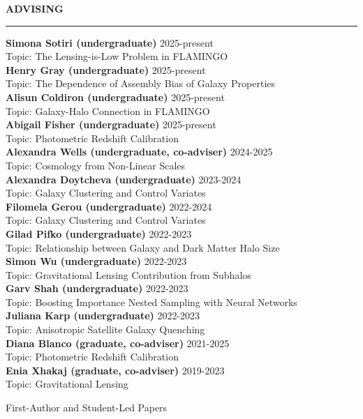 \documentclass[12pt]{article}
\renewenvironment{section}[1]
  {
  \medskip
  {\color{aublue} \MakeUppercase{\bf #1}}
  \smallskip
  \hrule
  \medskip
  \begin{adjustwidth}{0.3cm}{}
  }
  {
  \end{adjustwidth}
  }
\newenvironment{ref-section}[1]
  {
  \medskip
  {\color{aublue} \MakeUppercase{\bf #1}}
  \smallskip
  \hrule
  \medskip
  \begin{refsection}
  }
  {
  \end{refsection}
  }
\newcommand{\entry}[3]{{\bf #1} \hfill {#2} \\ {#3}}
\begin{document}
\begin{section}{Advising}
  \entry{Simona Sotiri (undergraduate)}{2025-present}{Topic: The Lensing-is-Low Problem in FLAMINGO} \\
  \entry{Henry Gray (undergraduate)}{2025-present}{Topic: The Dependence of Assembly Bias of Galaxy Properties} \\
  \entry{Alisun Coldiron (undergraduate)}{2025-present}{Topic: Galaxy-Halo Connection in FLAMINGO} \\
  \entry{Abigail Fisher (undergraduate)}{2025-present}{Topic: Photometric Redshift Calibration} \\
  \entry{Alexandra Wells (undergraduate, co-adviser)}{2024-2025}{Topic: Cosmology from Non-Linear Scales} \\
  \entry{Alexandra Doytcheva (undergraduate)}{2023-2024}{Topic: Galaxy Clustering and Control Variates} \\
  \entry{Filomela Gerou (undergraduate)}{2022-2024}{Topic: Galaxy Clustering and Control Variates} \\
  \entry{Gilad Pifko (undergraduate)}{2022-2023}{Topic: Relationship between Galaxy and Dark Matter Halo Size} \\
  \entry{Simon Wu (undergraduate)}{2022-2023}{Topic: Gravitational Lensing Contribution from Subhalos} \\
  \entry{Garv Shah (undergraduate)}{2022-2023}{Topic: Boosting Importance Nested Sampling with Neural Networks} \\
  \entry{Juliana Karp (undergraduate)}{2022-2023}{Topic: Anisotropic Satellite Galaxy Quenching} \\
  \entry{Diana Blanco (graduate, co-adviser)}{2021-2025}{Topic: Photometric Redshift Calibration} \\
  \entry{Enia Xhakaj (graduate, co-adviser)}{2019-2023}{Topic: Gravitational Lensing} \\
\end{section}

\begin{ref-section}{First-Author and Student-Led Papers}
  \nocite{Doytcheva2024_ApJ_977_184, Lange2024_OJAp_7_57, Lange2023_MNRAS_525_3181, Karp2023_ApJ_949_13, Lange2023_MNRAS_520_5373, Lange2022_MNRAS_509_1779, Lange2021_MNRAS_502_2074, Lange2019_MNRAS_490_1870, Lange2019_MNRAS_488_5771, Lange2019_MNRAS_487_3112, Lange2019_MNRAS_482_4824, Lange2018_MNRAS_473_2830, Lange2016_ApJ_819_4, Lange2015_MNRAS_447_939, Lange2013_AA_551_89}
  \printbibliography[heading=none]
\end{ref-section}
\end{document}
